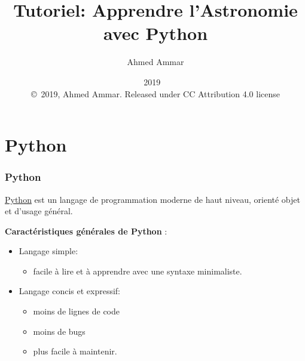 \documentclass{beamer}
\begin{document}

\newcommand{\exercisesection}[1]{\subsection*{#1}}







\title{Tutoriel: Apprendre l'Astronomie avec Python}


\author{Ahmed Ammar}

\date{2019
\ \\ 
{\tiny \copyright\ 2019, Ahmed Ammar. Released under CC Attribution 4.0 license}
}

\begin{frame}
\titlepage
\end{frame}

\section{Python}

\begin{frame}
\frametitle{Python}

\href{{http://www.python.org/}}{Python} est un langage de programmation moderne de haut niveau, orienté objet et d'usage général.

\textbf{Caractéristiques générales de Python} :

\begin{itemize}
\item Langage simple:
\begin{itemize}

  \item facile à lire et à apprendre avec une syntaxe minimaliste.

\end{itemize}

\noindent
\item Langage concis et expressif:
\begin{itemize}

  \item moins de lignes de code

  \item moins de bugs

  \item plus facile à maintenir.
\end{itemize}

\noindent
\end{itemize}

\noindent

\end{frame}
\end{document}
